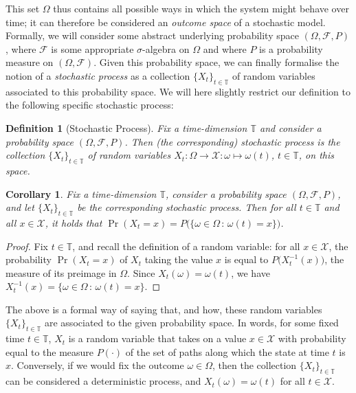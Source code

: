\documentclass[11pt]{book}
\newtheorem{corollary}[theorem]{Corollary}
\newtheorem{definition}{Definition}
\newcommand{\states}{\mathcal{X}}
\newcommand{\timedim}{\mathbb{T}}
\begin{document}
This set $\Omega$ thus contains all possible ways in which the system might behave over time; it can therefore be considered an \emph{outcome space} of a stochastic model. Formally, we will consider some abstract underlying probability space $(\Omega,\mathcal{F},P)$, where $\mathcal{F}$ is some appropriate $\sigma$-algebra on $\Omega$ and where $P$ is a probability measure on $(\Omega,\mathcal{F})$. Given this probability space, we can finally formalise the notion of a \emph{stochastic process} as a collection $\{X_t\}_{t\in\timedim}$ of random variables associated to this probability space. We will here slightly restrict our definition to the following specific stochastic process:
\begin{definition}[Stochastic Process]\label{def:stochastic_process}
Fix a time-dimension $\timedim$ and consider a probability space $(\Omega,\mathcal{F},P)$. Then (the corresponding) stochastic process is the collection $\{X_t\}_{t\in\timedim}$ of random variables $X_t:\Omega\to\states:\omega\mapsto\omega(t)$, $t\in\timedim$, on this space.
\end{definition}
\begin{corollary}\label{cor:process_prob_is_measure}
Fix a time-dimension $\timedim$, consider a probability space $(\Omega,\mathcal{F},P)$, and let $\{X_t\}_{t\in\timedim}$ be the corresponding stochastic process. Then for all $t\in\timedim$ and all $x\in\states$, it holds that $\Pr(X_t=x) = P\bigl( \{\omega\in\Omega\,:\,\omega(t)=x\} \bigr)$.
\end{corollary}
\begin{proof}
Fix $t\in\timedim$, and recall the definition of a random variable: for all $x\in\states$, the probability $\Pr(X_t=x)$ of $X_t$ taking the value $x$ is equal to $P\bigl(X_t^{-1}(x)\bigr)$, the measure of its preimage in $\Omega$. Since $X_t(\omega)=\omega(t)$, we have $X_t^{-1}(x)=\{\omega\in\Omega\,:\,\omega(t)=x\}$.
\end{proof}
The above is a formal way of saying that, and how, these random variables $\{X_t\}_{t\in\timedim}$ are associated to the given probability space. In words, for some fixed time $t\in\timedim$, $X_t$ is a random variable that takes on a value $x\in\states$ with probability equal to the measure $P(\cdot)$ of the set of paths along which the state at time $t$ is $x$. Conversely, if we would fix the outcome $\omega\in\Omega$, then the collection $\{X_t\}_{t\in\timedim}$ can be considered a deterministic process, and $X_t(\omega)=\omega(t)$ for all $t\in\states$.
\end{document}
